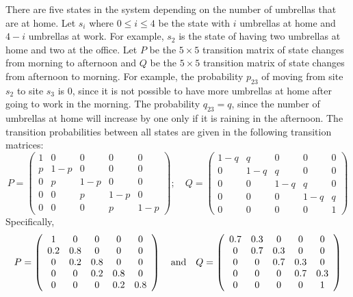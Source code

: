 There are five states in the system depending on the number of umbrellas that
are at home.  Let $s_i$ where $0\leq i\leq 4$ be the state with $i$ umbrellas
at home and $4-i$ umbrellas at work.  For example, $s_2$ is the state of
having two umbrellas at home and two at the office.  Let $P$ be the
$5\times 5$ transition matrix of state changes from morning to afternoon and
$Q$ be the $5\times 5$ transition matrix of state changes from afternoon to
morning.  For example, the probability $p_{23}$ of moving from site $s_2$ to
site $s_3$ is $0$, since it is not possible to have more umbrellas at home
after going to work in the morning.  The probability $q_{23}=q$, since the
number of umbrellas at home will increase by one only if it is raining in the
afternoon.  The transition probabilities between all states are given in the
following transition matrices:
\[
P = \left(\begin{array}{ccccc} 1 & 0 & 0 & 0 & 0 \\
  p & 1-p & 0 & 0 & 0 \\ 0 & p & 1-p & 0 & 0 \\ 0 & 0 & p & 1-p & 0 \\
 0 & 0 & 0 & p & 1-p \end{array}\right); \quad
Q = \left(\begin{array}{ccccc} 1-q & q & 0 & 0 & 0 \\
  0 & 1-q & q & 0 & 0 \\ 0 & 0 & 1-q & q & 0 \\ 0 & 0 & 0 & 1-q & q \\
 0 & 0 & 0 & 0 & 1 \end{array}\right)
\]
Specifically,
\begin{equation*}
P =
\left(\begin{array}{ccccc} 1 & 0 & 0 & 0 & 0 \\
  0.2 & 0.8 & 0 & 0 & 0 \\ 0 & 0.2 & 0.8 & 0 & 0 \\ 0 & 0 & 0.2 & 0.8 & 0 \\
 0 & 0 & 0 & 0.2 & 0.8 \end{array}\right) \quad\mbox{and}\quad
Q =
\left(\begin{array}{ccccc} 0.7 & 0.3 & 0 & 0 & 0 \\
  0 & 0.7 & 0.3 & 0 & 0 \\ 0 & 0 & 0.7 & 0.3 & 0 \\ 0 & 0 & 0 & 0.7 & 0.3 \\
 0 & 0 & 0 & 0 & 1 \end{array}\right)
\end{equation*}

